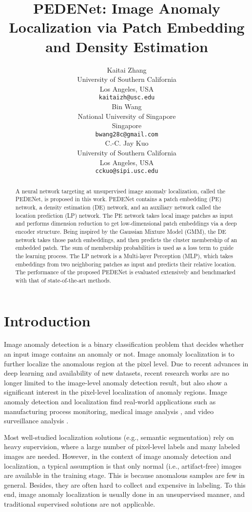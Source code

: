 \documentclass{article}
\title{PEDENet: Image Anomaly Localization via Patch Embedding and Density Estimation}
\author{
  Kaitai Zhang \\
  University of Southern California \\
  Los Angeles, USA\\
  \texttt{kaitaizh@usc.edu} \\
\And
  Bin Wang \\
  National University of Singapore \\
  Singapore\\
  \texttt{bwang28c@gmail.com} \\
   \And
  C.-C. Jay Kuo \\
  University of Southern California \\
  Los Angeles, USA\\
  \texttt{cckuo@sipi.usc.edu} \\
}
\begin{document}
\maketitle


\begin{abstract}
A neural network targeting at unsupervised image anomaly localization,
called the PEDENet, is proposed in this work.  PEDENet contains a patch
embedding (PE) network, a density estimation (DE) network, and an
auxiliary network called the location prediction (LP) network. The PE
network takes local image patches as input and performs dimension
reduction to get low-dimensional patch embeddings via a deep encoder
structure. Being inspired by the Gaussian Mixture Model (GMM), the DE
network takes those patch embeddings, and then predicts the cluster
membership of an embedded patch.  The sum of membership probabilities is
used as a loss term to guide the learning process. The
LP network is a Multi-layer Perception (MLP), which takes embeddings
from two neighboring patches as input and predicts their relative
location. The performance of the proposed PEDENet is evaluated
extensively and benchmarked with that of state-of-the-art methods.
\end{abstract}





\section{Introduction}\label{sec:introduction}

Image anomaly detection is a binary classification problem that decides
whether an input image contains an anomaly or not. Image anomaly
localization is to further localize the anomalous region at the pixel
level.  Due to recent advances in deep learning and availability of new
datasets, recent research works are no longer limited to the image-level
anomaly detection result, but also show a significant interest in the
pixel-level localization of anomaly regions.  Image anomaly detection
and localization find real-world applications such as manufacturing
process monitoring\cite{scime2018anomaly}, medical image analysis
\cite{schlegl2017unsupervised, schlegl2019f}, and video surveillance
analysis \cite{saligrama2012video,zhou2019anomalynet}. 

Most well-studied localization solutions (e.g., semantic segmentation)
rely on heavy supervision, where a large number of pixel-level labels
and many labeled images are needed. However, in the context of image
anomaly detection and localization, a typical assumption is that only
normal (i.e., artifact-free) images are available in the training stage.
This is because anomalous samples are few in general.  Besides, they are
often hard to collect and expensive in labeling.  To this end, image
anomaly localization is usually done in an unsupervised manner, and
traditional supervised solutions are not applicable. 
\end{document}
